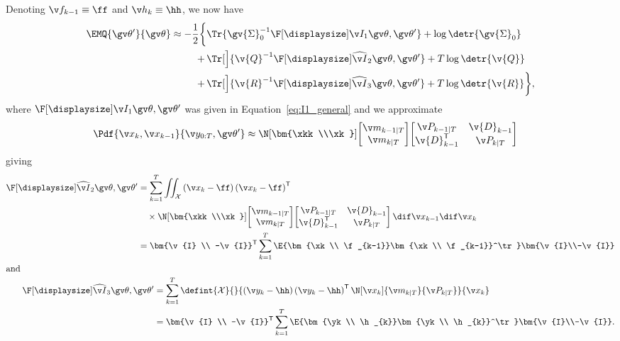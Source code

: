 Denoting $\f_{k-1}\equiv \ff$ and $\h_k\equiv \hh$, we now have
\begin{align}
\label{eq:EMQ_approx}
\begin{split}
	\EMQ{\Th'}{\Th} \approx -\frac{1}{2}\bigg\{&\Tr{\gv{\Sigma}_0^{-1}\II{1}}+\log\detr{\gv{\Sigma}_0}\\
	+\,&\Tr[\Big]{\v{Q}^{-1}\III{2}}+T\log\detr{\v{Q}}\\
	+\,&\Tr[\Big]{\v{R}^{-1}\III{3}}+T\log\detr{\v{R}}\bigg\},
\end{split}
\end{align}
where $\II{1}$ was given in Equation~\eqref{eq:I1_general} and
we approximate
\begin{align}
	\Pdf{\xk,\xkk}{\Y,\Th'}&\approx \N[\bm{\xkk\\\xk}]{
	\begin{bmatrix}
		\m_{k-1|T}\\
		\m_{k|T}
	\end{bmatrix}}{
	\begin{bmatrix}
		\P_{k-1|T}&\v{D}_{k-1}\\
		\v{D}_{k-1}^\tr&\P_{k|T}
	\end{bmatrix}
	}
	\label{eq:smooth_approx}
\end{align}
giving
\begin{align}
\begin{split}
\III{2} &= \sum_{k=1}^T\iint_\mathcal{X}\left(\x_k-\ff\right)\left(\x_k-\ff\right)^\tr\\
&\quad \times \N[\bm{\xkk\\\xk}]{
	\begin{bmatrix}
		\m_{k-1|T}\\
		\m_{k|T}
	\end{bmatrix}}{
	\begin{bmatrix}
		\P_{k-1|T}&\v{D}_{k-1}\\
		\v{D}_{k-1}^\tr&\P_{k|T}
	\end{bmatrix}
	}
	\,\dif\xkk\dif\xk \\
&=
\bm{\v{I} \\ -\v{I}}^\tr	
\sum_{k=1}^T
\E{\bm{\xk \\ \f_{k-1}}\bm{\xk \\ \f_{k-1}}^\tr} 
\bm{\v{I}\\-\v{I}}
\end{split}\label{eq:I2_approx}\\	
\shortintertext{and}
\begin{split}
\III{3} &=
\sum_{k=1}^T\defint{\mathcal{X}}{}{\left(\y_k-\hh\right)\left(\y_k-\hh\right)^\tr\N[\xk]{\m_{k|T}}{\P_{k|T}}}{\xk} \\
&=
\bm{\v{I} \\ -\v{I}}^\tr	
\sum_{k=1}^T
\E{\bm{\yk \\ \h_{k}}\bm{\yk \\ \h_{k}}^\tr} 
\bm{\v{I}\\-\v{I}}.
\end{split}\label{eq:I3_approx}	
\end{align}
